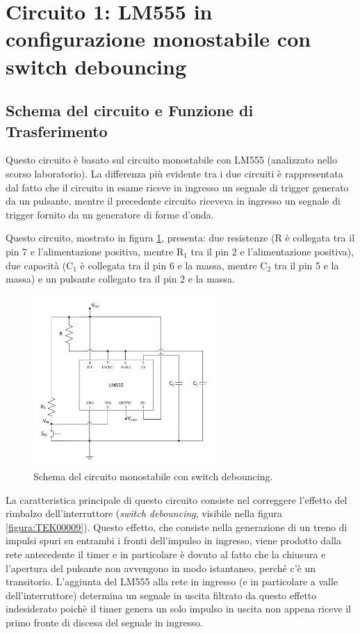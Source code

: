 \documentclass{report}
\begin{document}
\newpage
\section{Circuito 1: LM555 in configurazione monostabile con switch debouncing}
\subsection{Schema del circuito e Funzione di Trasferimento}
Questo circuito è basato sul circuito monostabile con LM555 (analizzato nello scorso laboratorio). La differenza più evidente tra i due circuiti è rappresentata dal fatto che il circuito in esame riceve in ingresso un segnale di trigger generato da un pulsante, mentre il precedente circuito riceveva in ingresso un segnale di trigger fornito da un generatore di forme d'onda.

Questo circuito, mostrato in figura \ref{figura:schema1}, presenta: due resistenze (R è collegata tra il pin 7 e l'alimentazione positiva, mentre $\mathrm{R_1}$ tra il pin 2 e l'alimentazione positiva), due capacità ($\mathrm{C_1}$ è collegata tra il pin 6 e la massa, mentre $\mathrm{C_2}$ tra il pin 5 e la massa) e un pulsante collegato tra il pin 2 e la massa.

\begin{figure}[h!]
	\centering
	\includegraphics[height=6.5cm]{immagini/schema1}
	\caption{Schema del circuito monostabile con switch debouncing.}
	\label{figura:schema1}
\end{figure}

\noindent La caratteristica principale di questo circuito consiste nel correggere l'effetto del rimbalzo dell'interruttore (\textit{switch debouncing}, visibile nella figura \ref{figura:TEK00009}). Questo effetto, che consiste nella generazione di un treno di impulsi spuri su entrambi i fronti dell'impulso in ingresso, viene prodotto dalla rete antecedente il timer e in particolare è dovuto al fatto che la chiusura e l'apertura del pulsante non avvengono in modo istantaneo, perché c'è un transitorio. L'aggiunta del LM555 alla rete in ingresso (e in particolare a valle dell'interruttore) determina un segnale in uscita filtrato da questo effetto indesiderato poichè il timer genera un solo impulso in uscita non appena riceve il primo fronte di discesa del segnale in ingresso. %
\end{document}
